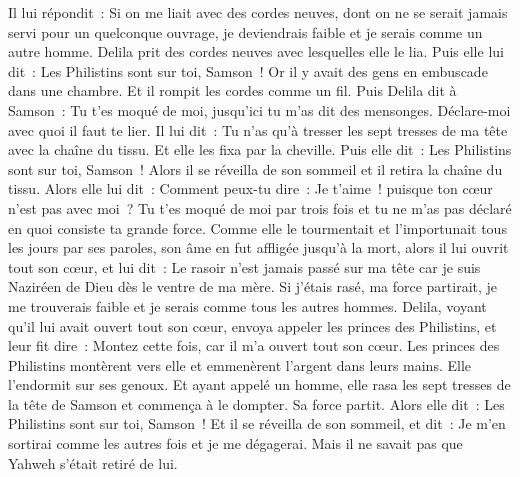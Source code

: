 \begin{multicols}{2}
Il lui répondit~: Si on me liait avec des cordes neuves, dont on ne se serait jamais servi pour un quelconque ouvrage, je deviendrais faible et je serais comme un autre homme.
Delila prit des cordes neuves avec lesquelles elle le lia. Puis elle lui dit~: Les Philistins sont sur toi, Samson~! Or il y avait des gens en embuscade dans une chambre. Et il rompit les cordes comme un fil.
Puis Delila dit à Samson~: Tu t'es moqué de moi, jusqu'ici tu m'as dit des mensonges. Déclare-moi avec quoi il faut te lier. Il lui dit~: Tu n'as qu'à tresser les sept tresses de ma tête avec la chaîne du tissu.
Et elle les fixa par la cheville. Puis elle dit~: Les Philistins sont sur toi, Samson~! Alors il se réveilla de son sommeil et il retira la chaîne du tissu.
Alors elle lui dit~: Comment peux-tu dire~: Je t'aime~! puisque ton cœur n'est pas avec moi~? Tu t'es moqué de moi par trois fois et tu ne m'as pas déclaré en quoi consiste ta grande force.
Comme elle le tourmentait et l'importunait tous les jours par ses paroles, son âme en fut affligée jusqu'à la mort,
alors il lui ouvrit tout son cœur, et lui dit~: Le rasoir n'est jamais passé sur ma tête car je suis Naziréen de Dieu dès le ventre de ma mère. Si j'étais rasé, ma force partirait, je me trouverais faible et je serais comme tous les autres hommes.
Delila, voyant qu'il lui avait ouvert tout son cœur, envoya appeler les princes des Philistins, et leur fit dire~: Montez cette fois, car il m'a ouvert tout son cœur. Les princes des Philistins montèrent vers elle et emmenèrent l'argent dans leurs mains.
Elle l'endormit sur ses genoux. Et ayant appelé un homme, elle rasa les sept tresses de la tête de Samson et commença à le dompter. Sa force partit.
Alors elle dit~: Les Philistins sont sur toi, Samson~! Et il se réveilla de son sommeil, et dit~: Je m'en sortirai comme les autres fois et je me dégagerai. Mais il ne savait pas que Yahweh s'était retiré de lui.

\end{multicols}
